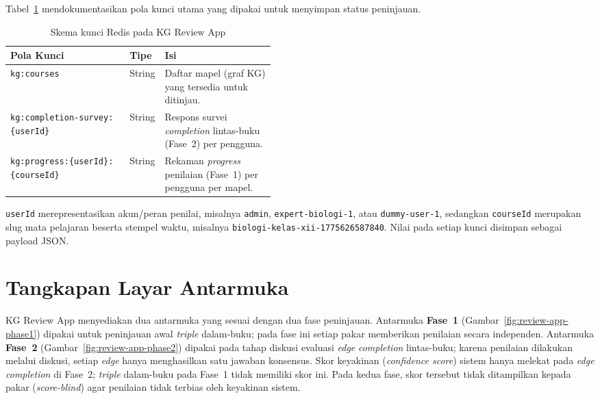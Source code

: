 \documentclass[main]{subfiles}
\begin{document}
Tabel~\ref{tab:skema-redis} mendokumentasikan pola kunci utama yang dipakai
untuk menyimpan status peninjauan.

\begin{table}[htbp]
  \centering\small
  \caption{Skema kunci Redis pada KG Review App}
  \label{tab:skema-redis}
  \begin{tabularx}{\linewidth}{@{}p{0.45\linewidth} l X@{}}
    \toprule
    \textbf{Pola Kunci} & \textbf{Tipe} & \textbf{Isi} \\
    \midrule
    \texttt{kg:courses}
      & String & Daftar mapel (graf KG) yang tersedia untuk ditinjau. \\
    \texttt{kg:completion-survey:\{userId\}}
      & String & Respons survei \textit{completion} lintas-buku (Fase~2) per pengguna. \\
    \texttt{kg:progress:\{userId\}:\{courseId\}}
      & String & Rekaman \textit{progress} penilaian (Fase~1) per pengguna per mapel. \\
    \bottomrule
  \end{tabularx}
\end{table}

\noindent \texttt{userId} merepresentasikan akun/peran penilai, misalnya
\texttt{admin}, \texttt{expert-biologi-1}, atau \texttt{dummy-user-1}, sedangkan
\texttt{courseId} merupakan slug mata pelajaran beserta stempel waktu, misalnya
\texttt{biologi-kelas-xii-1775626587840}. Nilai pada setiap kunci disimpan
sebagai payload JSON.

\section{Tangkapan Layar Antarmuka}
\label{lamp:tangkapan-layar}

KG Review App menyediakan dua antarmuka yang sesuai dengan dua fase peninjauan.
Antarmuka \textbf{Fase~1} (Gambar~\ref{fig:review-app-phase1}) dipakai untuk
peninjauan awal \textit{triple} dalam-buku; pada fase ini setiap pakar
memberikan penilaian secara independen. Antarmuka \textbf{Fase~2}
(Gambar~\ref{fig:review-app-phase2}) dipakai pada tahap diskusi evaluasi
\textit{edge} \textit{completion} lintas-buku; karena penilaian dilakukan
melalui diskusi, setiap \textit{edge} hanya menghasilkan satu jawaban konsensus.
Skor keyakinan (\textit{confidence score}) sistem hanya melekat pada \textit{edge}
\textit{completion} di Fase~2; \textit{triple} dalam-buku pada Fase~1 tidak
memiliki skor ini. Pada kedua fase, skor tersebut tidak ditampilkan kepada pakar
(\textit{score-blind}) agar penilaian tidak terbias oleh keyakinan sistem.
\end{document}

